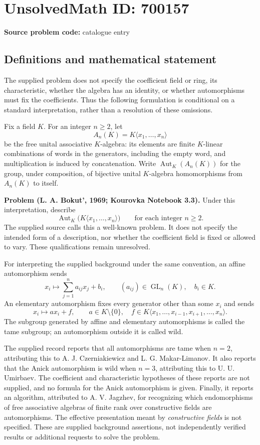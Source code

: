 \documentclass[11pt]{article}
\begin{document}
\section*{UnsolvedMath ID: 700157}
\textbf{Source problem code:} catalogue entry
\subsection{Definitions and mathematical statement}
The supplied problem does not specify the coefficient field or ring, its characteristic, whether the algebra has an identity, or whether automorphisms must fix the coefficients. Thus the following formulation is conditional on a standard interpretation, rather than a resolution of these omissions.

Fix a field \(K\). For an integer \(n\geq 2\), let
\[
A_n(K)=K\langle x_1,\ldots,x_n\rangle
\]
be the free unital associative \(K\)-algebra: its elements are finite \(K\)-linear combinations of words in the generators, including the empty word, and multiplication is induced by concatenation. Write \(\operatorname{Aut}_{K}(A_n(K))\) for the group, under composition, of bijective unital \(K\)-algebra homomorphisms from \(A_n(K)\) to itself.

\textbf{Problem (L. A. Bokut', 1969; Kourovka Notebook 3.3).} Under this interpretation, describe
\[
\operatorname{Aut}_{K}\bigl(K\langle x_1,\ldots,x_n\rangle\bigr)
\qquad\text{for each integer }n\geq 2.
\]
The supplied source calls this a well-known problem. It does not specify the intended form of a description, nor whether the coefficient field is fixed or allowed to vary. These qualifications remain unresolved.

For interpreting the supplied background under the same convention, an affine automorphism sends
\[
x_i\longmapsto \sum_{j=1}^{n}a_{ij}x_j+b_i,
\qquad (a_{ij})\in\operatorname{GL}_n(K),\quad b_i\in K.
\]
An elementary automorphism fixes every generator other than some \(x_i\) and sends
\[
x_i\longmapsto a x_i+f,
\qquad a\in K\setminus\{0\},\quad
f\in K\langle x_1,\ldots,x_{i-1},x_{i+1},\ldots,x_n\rangle.
\]
The subgroup generated by affine and elementary automorphisms is called the tame subgroup; an automorphism outside it is called wild.

The supplied record reports that all automorphisms are tame when \(n=2\), attributing this to A. J. Czerniakiewicz and L. G. Makar-Limanov. It also reports that the Anick automorphism is wild when \(n=3\), attributing this to U. U. Umirbaev. The coefficient and characteristic hypotheses of these reports are not supplied, and no formula for the Anick automorphism is given. Finally, it reports an algorithm, attributed to A. V. Jagzhev, for recognizing which endomorphisms of free associative algebras of finite rank over constructive fields are automorphisms. The effective presentation meant by \emph{constructive fields} is not specified. These are supplied background assertions, not independently verified results or additional requests to solve the problem.
\end{document}
